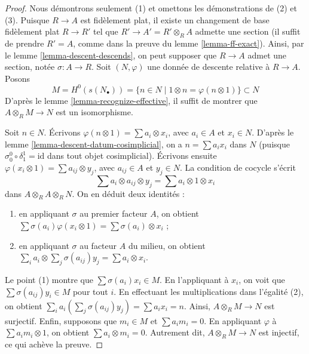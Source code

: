\begin{proof}
Nous démontrons seulement (1) et omettons les démonstrations de (2) et (3).
Puisque $R \to A$ est fidèlement plat, il existe un changement de base
fidèlement plat $R \to R'$ tel que $R' \to A' = R' \otimes_R A$
admette une section (il suffit de prendre $R' = A$, comme dans la preuve du
lemme \ref{lemma-ff-exact}). Ainsi, par le
lemme \ref{lemma-descent-descends}, on peut supposer que
$R \to A$ admet une section, notée $\sigma : A \to R$.
Soit $(N, \varphi)$ une donnée de descente relative à $R \to A$.
Posons
$$
M = H^0(s(N_\bullet)) = \{n \in N \mid 1 \otimes n = \varphi(n \otimes 1)\}
\subset
N
$$
D'après le lemme \ref{lemma-recognize-effective}, il suffit de montrer que
$A \otimes_R M \to N$ est un isomorphisme.

\medskip\noindent
Soit $n \in N$. Écrivons
$\varphi(n \otimes 1) = \sum a_i \otimes x_i$, avec
$a_i \in A$ et $x_i \in N$. D'après le lemme \ref{lemma-descent-datum-cosimplicial},
on a $n = \sum a_i x_i$ dans $N$ (puisque
$\sigma^0_0 \circ \delta^1_1 = \text{id}$ dans tout objet cosimplicial).
Écrivons ensuite $\varphi(x_i \otimes 1) = \sum a_{ij} \otimes y_j$, avec
$a_{ij} \in A$ et $y_j \in N$.
La condition de cocycle s'écrit
$$
\sum a_i \otimes a_{ij} \otimes y_j = \sum a_i \otimes 1 \otimes x_i
$$
dans $A \otimes_R A \otimes_R N$. On en déduit deux identités :
\begin{enumerate}
\item en appliquant $\sigma$ au premier facteur $A$, on obtient
$\sum \sigma(a_i) \varphi(x_i \otimes 1) = \sum \sigma(a_i) \otimes x_i$ ;
\item en appliquant $\sigma$ au facteur $A$ du milieu, on obtient
$\sum_i a_i \otimes \sum_j \sigma(a_{ij}) y_j = \sum a_i \otimes x_i$.
\end{enumerate}
Le point (1) montre que $\sum \sigma(a_i) x_i \in M$. En l'appliquant à
$x_i$, on voit que $\sum \sigma(a_{ij})y_i \in M$ pour tout $i$.
En effectuant les multiplications dans l'égalité (2), on obtient
$\sum_i a_i (\sum_j \sigma(a_{ij}) y_j) = \sum a_i x_i = n$.
Ainsi, $A \otimes_R M \to N$ est surjectif.
Enfin, supposons que $m_i \in M$ et $\sum a_i m_i = 0$.
En appliquant $\varphi$ à
$\sum a_im_i \otimes 1$, on obtient $\sum a_i \otimes m_i = 0$.
Autrement dit, $A \otimes_R M \to N$ est injectif, ce qui achève la preuve.
\end{proof}

